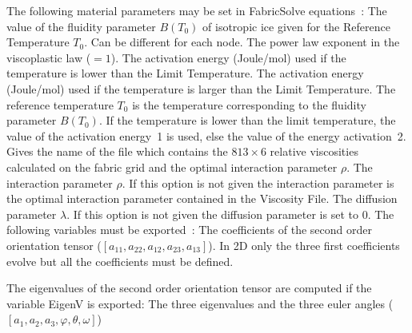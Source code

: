  The following material parameters may be set in FabricSolve equations~:
%
 \sifbegin
%
  The value of the fluidity parameter $B(T_0)$ of isotropic ice given for the
 Reference Temperature $T_0$. Can be different for each node.
%
  The power law exponent in the viscoplastic law ($=1$).
%
  The activation energy (Joule/mol) used if the temperature is lower than the Limit
 Temperature.
%
  The activation energy (Joule/mol) used if the temperature is larger than the Limit
 Temperature.
%
  The reference temperature $T_0$ is the temperature corresponding to the  fluidity
 parameter $B(T_0)$.
%
  If the temperature is lower than the limit temperature, the value of the activation
 energy~1 is used, else the value of the energy activation~2.
%
  Gives the name of the file which contains the $813 \times 6$ relative viscosities
 calculated on the fabric grid and the optimal interaction parameter $\rho$.
%
  The interaction parameter $\rho$. If this option is not given the 
 interaction parameter is the optimal interaction parameter contained in the Viscosity File.
%
  The diffusion parameter $\lambda$. If this option is not given the 
 diffusion parameter is set to 0.
 \sifend
%
 \sifbegin
 \sifend
%
 The following variables must be exported~:
%
 \sifbegin
 The coefficients of the second order orientation tensor ($[a_{11}, a_{22}, a_{12}, a_{23}, a_{13}]$).
 In 2D only the three first coefficients evolve but all the coefficients must be
 defined.
 \sifend

The eigenvalues of the second order orientation tensor are computed if the variable EigenV is exported:
\sifbegin
The three eigenvalues and the three euler angles ($[a_{1}, a_{2}, a_{3}, \varphi , \theta, \omega]$)
 \sifend

